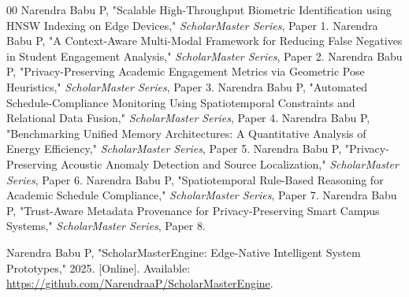 \documentclass[conference]{IEEEtran}
\begin{document}
\begin{thebibliography}{00}
 Narendra Babu P, "Scalable High-Throughput Biometric Identification using HNSW Indexing on Edge Devices," \textit{ScholarMaster Series}, Paper 1.
 Narendra Babu P, "A Context-Aware Multi-Modal Framework for Reducing False Negatives in Student Engagement Analysis," \textit{ScholarMaster Series}, Paper 2.
 Narendra Babu P, "Privacy-Preserving Academic Engagement Metrics via Geometric Pose Heuristics," \textit{ScholarMaster Series}, Paper 3.
 Narendra Babu P, "Automated Schedule-Compliance Monitoring Using Spatiotemporal Constraints and Relational Data Fusion," \textit{ScholarMaster Series}, Paper 4.
 Narendra Babu P, "Benchmarking Unified Memory Architectures: A Quantitative Analysis of Energy Efficiency," \textit{ScholarMaster Series}, Paper 5.
 Narendra Babu P, "Privacy-Preserving Acoustic Anomaly Detection and Source Localization," \textit{ScholarMaster Series}, Paper 6.
 Narendra Babu P, "Spatiotemporal Rule-Based Reasoning for Academic Schedule Compliance," \textit{ScholarMaster Series}, Paper 7.
 Narendra Babu P, "Trust-Aware Metadata Provenance for Privacy-Preserving Smart Campus Systems," \textit{ScholarMaster Series}, Paper 8.

 Narendra Babu P, "ScholarMasterEngine: Edge-Native Intelligent System Prototypes," 2025. [Online]. Available: \url{https://github.com/NarendraaP/ScholarMasterEngine}.

\end{thebibliography}
\end{document}
